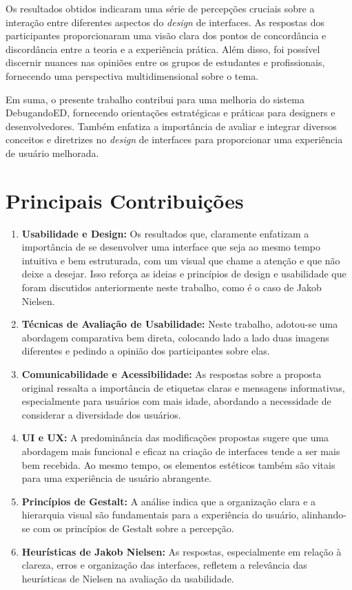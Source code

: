 Os resultados obtidos indicaram uma série de percepções cruciais sobre a interação entre diferentes aspectos do \textit{design} de interfaces. As respostas dos participantes proporcionaram uma visão clara dos pontos de concordância e discordância entre a teoria e a experiência prática. Além disso, foi possível discernir nuances nas opiniões entre os grupos de estudantes e profissionais, fornecendo uma perspectiva multidimensional sobre o tema.

Em suma, o presente trabalho contribui para uma melhoria do sistema DebugandoED, fornecendo orientações estratégicas e práticas para designers e desenvolvedores. Também enfatiza a importância de avaliar e integrar diversos conceitos e diretrizes no \textit{design} de interfaces para proporcionar uma experiência de usuário melhorada.	

\section{Principais Contribuições}
\begin{enumerate}
    \item \textbf{Usabilidade e Design:} Os resultados que, claramente enfatizam a importância de se desenvolver uma interface que seja ao mesmo tempo intuitiva e bem estruturada, com um visual que chame a atenção e que não deixe a desejar. Isso reforça as ideias e princípios de design e usabilidade que foram discutidos anteriormente neste trabalho, como é o caso de Jakob Nielsen.
    \item \textbf{Técnicas de Avaliação de Usabilidade:} Neste trabalho, adotou-se uma abordagem comparativa bem direta, colocando lado a lado duas imagens diferentes e pedindo a opinião dos participantes sobre elas.
    \item \textbf{Comunicabilidade e Acessibilidade:} As respostas sobre a proposta original ressalta a importância de etiquetas claras e mensagens informativas, especialmente para usuários com mais idade, abordando a necessidade de considerar a diversidade dos usuários.
    \item \textbf{UI e UX:} A predominância das modificações propostas sugere que uma abordagem mais funcional e eficaz na criação de interfaces tende a ser mais bem recebida. Ao mesmo tempo, os elementos estéticos também são vitais para uma experiência de usuário abrangente.
    \item \textbf{Princípios de Gestalt:} A análise indica que a organização clara e a hierarquia visual são fundamentais para a experiência do usuário, alinhando-se com os princípios de Gestalt sobre a percepção.
    \item \textbf{Heurísticas de Jakob Nielsen:} As respostas, especialmente em relação à clareza, erros e organização das interfaces, refletem a relevância das heurísticas de Nielsen na avaliação da usabilidade.
\end{enumerate}
 
